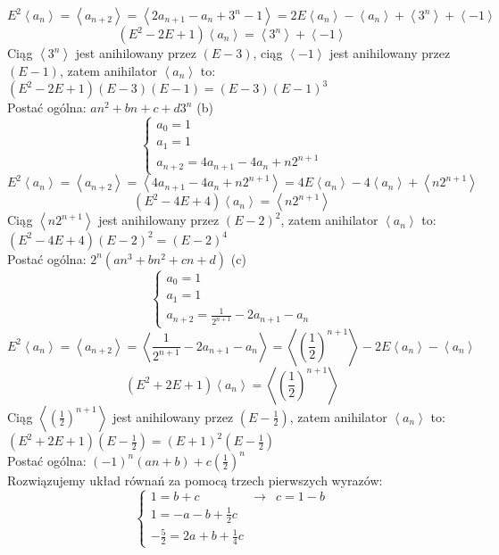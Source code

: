 \documentclass[12pt,a4paper]{article}
\begin{document}
\[
	E^2 \left< a_n \right> = \left< a_{n+2} \right> 
	= \left< 2a_{n+1} - a_{n} + 3^n - 1 \right> 
	= 2E\left< a_n \right> - \left< a_n \right> + \left< 3^n \right> + \left< -1 \right>
\]
\[
	(E^2 - 2E + 1) \left< a_n \right> = \left< 3^n \right> + \left< -1 \right>
\]
Ciąg \( \left< 3^n \right> \) jest anihilowany przez \( (E - 3) \), ciąg \( \left< -1 \right> \) jest anihilowany przez \( (E - 1) \), zatem anihilator \( \left< a_n \right> \) to: 
\( (E^2 - 2E + 1)(E - 3)(E - 1) = (E - 3)(E - 1)^3  \) \\
Postać ogólna: \( a n^2 + b n + c + d 3^n \)
\vskip 0.4cm
(b)
\[
	\left\{ 
	\begin{array}{l}
		a_0 = 1 \\
		a_1 = 1 \\
		a_{n + 2} = 4a_{n+1} - 4a_{n} + n2^{n+1}
	\end{array} 
	\right.
\]
\[
	E^2 \left< a_n \right> = \left< a_{n+2} \right> 
	= \left< 4a_{n+1} - 4a_{n} + n2^{n+1} \right> 
	= 4E\left< a_n \right> - 4\left< a_n \right> + \left< n2^{n+1} \right>
\]
\[
	(E^2 - 4E + 4) \left< a_n \right> = \left< n2^{n+1} \right>
\]
Ciąg \( \left< n2^{n+1} \right> \) jest anihilowany przez \( (E - 2)^2 \), zatem anihilator 
\( \left< a_n \right> \) to: 
\( (E^2 - 4E + 4)(E - 2)^2 = (E - 2)^4  \) \\
Postać ogólna: \( 2^n(an^3 + bn^2 + cn + d) \)
\vskip 0.4cm
(c)
\[
	\left\{ 
	\begin{array}{l}
		a_0 = 1 \\
		a_1 = 1 \\
		a_{n + 2} = \frac{1}{2^{n+1}} - 2a_{n+1} - a_n
	\end{array} 
	\right.
\]
\[
	E^2 \left< a_n \right> = \left< a_{n+2} \right> 
	= \left< \frac{1}{2^{n+1}} - 2a_{n+1} - a_n \right> 
	= \left< \left(\frac{1}{2}\right)^{n+1} \right> - 2E\left< a_n \right> - \left< a_n \right>
\]
\[
	(E^2 + 2E + 1) \left< a_n \right> = \left< \left(\frac{1}{2}\right)^{n+1} \right>
\]
Ciąg \( \left< \left(\frac{1}{2}\right)^{n+1} \right> \) jest anihilowany przez \( (E - \frac{1}{2}) \), zatem anihilator \( \left< a_n \right> \) to: \\ 
\( (E^2 +2E + 1)(E - \frac{1}{2}) = (E + 1)^2(E - \frac{1}{2})  \) \\
Postać ogólna: \( (-1)^n(an + b) + c\left(\frac{1}{2}\right)^n \) \\
Rozwiązujemy układ równań za pomocą trzech pierwszych wyrazów:
\[
	\left\{ 
	\begin{array}{lll}
		1 = b + c &  \rightarrow & c = 1 - b\\
		1 = -a - b + \frac{1}{2}c \\
		-\frac{5}{2} = 2a + b + \frac{1}{4}c
	\end{array} 
	\right.
\]
\end{document}
